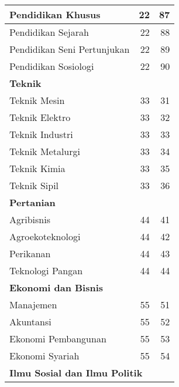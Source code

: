 \documentclass[
]{book}
\begin{document}
\begin{longtable}{l|r|r}
\hline
\hspace{1em}Pendidikan Khusus & 22 & 87\\
\hline
\hspace{1em}Pendidikan Sejarah & 22 & 88\\
\hline
\hspace{1em}Pendidikan Seni Pertunjukan & 22 & 89\\
\hline
\hspace{1em}Pendidikan Sosiologi & 22 & 90\\
\hline
\multicolumn{3}{l}{\textbf{Teknik}}\\
\hline
\hspace{1em}Teknik Mesin & 33 & 31\\
\hline
\hspace{1em}Teknik Elektro & 33 & 32\\
\hline
\hspace{1em}Teknik Industri & 33 & 33\\
\hline
\hspace{1em}Teknik Metalurgi & 33 & 34\\
\hline
\hspace{1em}Teknik Kimia & 33 & 35\\
\hline
\hspace{1em}Teknik Sipil & 33 & 36\\
\hline
\multicolumn{3}{l}{\textbf{Pertanian}}\\
\hline
\hspace{1em}Agribisnis & 44 & 41\\
\hline
\hspace{1em}Agroekoteknologi & 44 & 42\\
\hline
\hspace{1em}Perikanan & 44 & 43\\
\hline
\hspace{1em}Teknologi Pangan & 44 & 44\\
\hline
\multicolumn{3}{l}{\textbf{Ekonomi dan Bisnis}}\\
\hline
\hspace{1em}Manajemen & 55 & 51\\
\hline
\hspace{1em}Akuntansi & 55 & 52\\
\hline
\hspace{1em}Ekonomi Pembangunan & 55 & 53\\
\hline
\hspace{1em}Ekonomi Syariah & 55 & 54\\
\hline
\multicolumn{3}{l}{\textbf{Ilmu Sosial dan Ilmu Politik}}\\

\end{longtable}
\end{document}
